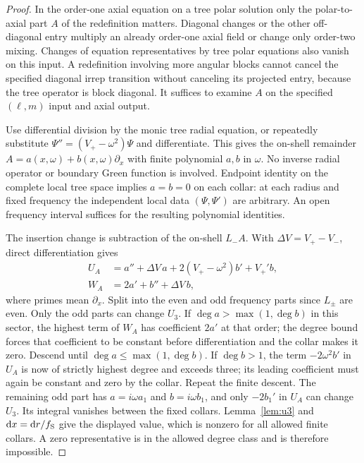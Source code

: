 \documentclass[11pt]{article}
\newcommand{\dd}{\mathrm d}
\begin{document}
\begin{proof}
In the order-one axial equation on a tree polar solution only the polar-to-axial part \(A\) of the redefinition matters. Diagonal changes or the other off-diagonal entry multiply an already order-one axial field or change only order-two mixing. Changes of equation representatives by tree polar equations also vanish on this input. A redefinition involving more angular blocks cannot cancel the specified diagonal irrep transition without canceling its projected entry, because the tree operator is block diagonal. It suffices to examine \(A\) on the specified \((\ell,m)\) input and axial output.

Use differential division by the monic tree radial equation, or repeatedly substitute \(\Psi''=(V_+-\omega^2)\Psi\) and differentiate. This gives the on-shell remainder \(A=a(x,\omega)+b(x,\omega)\partial_x\) with finite polynomial \(a,b\) in \(\omega\). No inverse radial operator or boundary Green function is involved. Endpoint identity on the complete local tree space implies \(a=b=0\) on each collar: at each radius and fixed frequency the independent local data \((\Psi,\Psi')\) are arbitrary. An open frequency interval suffices for the resulting polynomial identities.

The insertion change is subtraction of the on-shell \(L_-A\). With \(\Delta V=V_+-V_-\), direct differentiation gives
\begin{align}
 U_A&=a''+\Delta V\,a+2(V_+-\omega^2)b'+V_+' b,\\
 W_A&=2a'+b''+\Delta V\,b ,
 \label{eq:change}
\end{align}
where primes mean \(\partial_x\). Split into the even and odd frequency parts since \(L_\pm\) are even. Only the odd parts can change \(U_3\). If \(\deg a>\max(1,\deg b)\) in this sector, the highest term of \(W_A\) has coefficient \(2a'\) at that order; the degree bound forces that coefficient to be constant before differentiation and the collar makes it zero. Descend until \(\deg a\le\max(1,\deg b)\). If \(\deg b>1\), the term \(-2\omega^2b'\) in \(U_A\) is now of strictly highest degree and exceeds three; its leading coefficient must again be constant and zero by the collar. Repeat the finite descent. The remaining odd part has \(a=i\omega a_1\) and \(b=i\omega b_1\), and only \(-2b_1'\) in \(U_A\) can change \(U_3\). Its integral vanishes between the fixed collars. Lemma~\ref{lem:u3} and \(\dd x=\dd r/f_{\rm S}\) give the displayed value, which is nonzero for all allowed finite collars. A zero representative is in the allowed degree class and is therefore impossible.
\end{proof}
\end{document}
